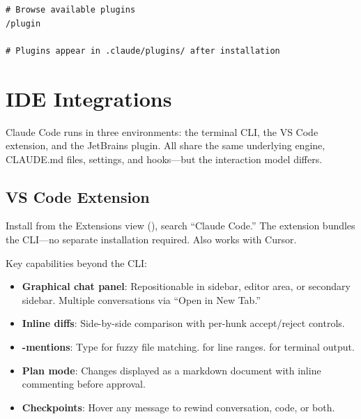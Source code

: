
\begin{verbatim}
# Browse available plugins
/plugin

# Plugins appear in .claude/plugins/ after installation
\end{verbatim}


\section{IDE Integrations}
\label{sec:ide-integrations}


Claude Code runs in three environments: the terminal CLI, the VS Code
extension, and the JetBrains plugin. All share the same underlying
engine, CLAUDE.md files, settings, and hooks---but the interaction
model differs.

\subsection*{VS Code Extension}


Install from the Extensions view (), search
``Claude Code.'' The extension bundles the CLI---no separate
installation required. Also works with Cursor.

Key capabilities beyond the CLI:

\begin{itemize}
  \item \textbf{Graphical chat panel}: Repositionable in sidebar,
    editor area, or secondary sidebar. Multiple conversations
    via ``Open in New Tab.''
  \item \textbf{Inline diffs}: Side-by-side comparison with
    per-hunk accept/reject controls.
  \item \textbf{-mentions}: Type  for fuzzy file
    matching.  for line ranges.
     for terminal output.
  \item \textbf{Plan mode}: Changes displayed as a markdown document
    with inline commenting before approval.
  \item \textbf{Checkpoints}: Hover any message to rewind conversation,
    code, or both.
\end{itemize}

